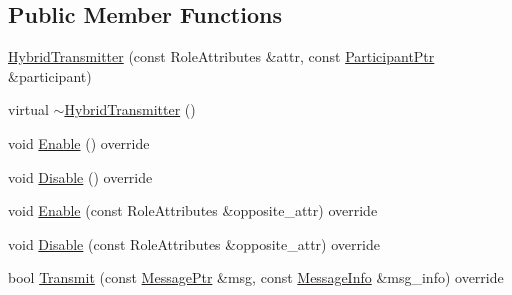\subsection*{Public Member Functions}
\begin{DoxyCompactItemize}
\item 
\hyperlink{classapollo_1_1cyber_1_1transport_1_1HybridTransmitter_a90dae149351190abc01613a5a251e1df}{Hybrid\-Transmitter} (const Role\-Attributes \&attr, const \hyperlink{namespaceapollo_1_1cyber_1_1transport_a4214d0780331276d0384d0b57e3bc688}{Participant\-Ptr} \&participant)
\item 
virtual \hyperlink{classapollo_1_1cyber_1_1transport_1_1HybridTransmitter_acc4dd5cb2c487025c98495418e892839}{$\sim$\-Hybrid\-Transmitter} ()
\item 
void \hyperlink{classapollo_1_1cyber_1_1transport_1_1HybridTransmitter_af1d4c607ebc0c0fd5c28d0c3644ba333}{Enable} () override
\item 
void \hyperlink{classapollo_1_1cyber_1_1transport_1_1HybridTransmitter_a6bd7f1c0477247a80f79e6a845d7b3cd}{Disable} () override
\item 
void \hyperlink{classapollo_1_1cyber_1_1transport_1_1HybridTransmitter_a164dfe249d1bd676ccdeedd8eb1a9722}{Enable} (const Role\-Attributes \&opposite\-\_\-attr) override
\item 
void \hyperlink{classapollo_1_1cyber_1_1transport_1_1HybridTransmitter_affb916656d7c94753bc1fba374c0cc3c}{Disable} (const Role\-Attributes \&opposite\-\_\-attr) override
\item 
bool \hyperlink{classapollo_1_1cyber_1_1transport_1_1HybridTransmitter_a322bcb6a0b2fcff5ddb41b682605e333}{Transmit} (const \hyperlink{classapollo_1_1cyber_1_1transport_1_1HybridTransmitter_ae4da0fb39a90d084d271b8522afc0881}{Message\-Ptr} \&msg, const \hyperlink{classapollo_1_1cyber_1_1transport_1_1MessageInfo}{Message\-Info} \&msg\-\_\-info) override
\end{DoxyCompactItemize}
